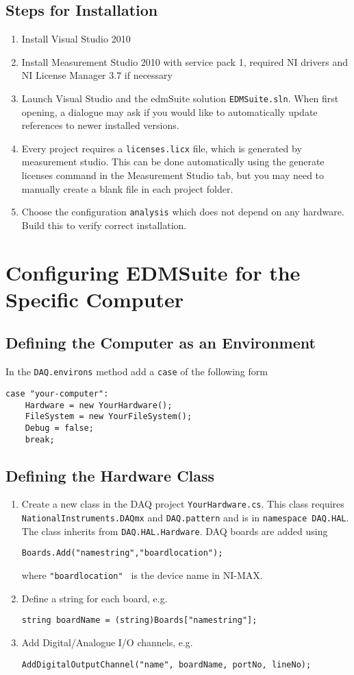 \documentclass{article}
\begin{document}
\subsection{Steps for Installation}
\begin{enumerate}
\item Install Visual Studio 2010
\item Install Measurement Studio 2010 with service pack 1, required NI drivers and NI License Manager 3.7 if necessary
\item Launch Visual Studio and the edmSuite solution \lstinline|EDMSuite.sln|. When first opening, a dialogue may ask if you would like to automatically update references to newer installed versions.
\item Every project requires a \lstinline|licenses.licx| file, which is generated by measurement studio. This can be done automatically using the generate licenses command in the Measurement Studio tab, but you may need to manually create a blank file in each project folder.
\item Choose the configuration \lstinline|analysis| which does not depend on any hardware. Build this to verify correct installation. 
\end{enumerate}
\section{Configuring EDMSuite for the Specific Computer}
\subsection{Defining the Computer as an Environment}
In the \lstinline|DAQ.environs| method add a \lstinline|case| of the following form
\begin{lstlisting}
case "your-computer":
	Hardware = new YourHardware();
	FileSystem = new YourFileSystem();
	Debug = false;
	break;
\end{lstlisting}
\subsection{Defining the Hardware Class}
\begin{enumerate}
\item Create a new class in the DAQ project \lstinline|YourHardware.cs|. This class requires \lstinline|NationalInstruments.DAQmx| and \lstinline|DAQ.pattern| and is in  \lstinline|namespace DAQ.HAL|. The class inherits from \lstinline|DAQ.HAL.Hardware|. DAQ boards are added using
\begin{lstlisting}
Boards.Add("namestring","boardlocation");
\end{lstlisting}
where \lstinline|"boardlocation" | is the device name in NI-MAX. 
\item Define a string for each board, e.g.
\begin{lstlisting}
string boardName = (string)Boards["namestring"];
\end{lstlisting}
\item Add Digital/Analogue I/O channels, e.g.
\begin{lstlisting}
AddDigitalOutputChannel("name", boardName, portNo, lineNo);
\end{lstlisting}
\end{enumerate}
\end{document}
